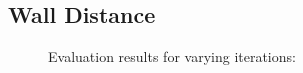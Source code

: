 \subsection{Wall Distance}

\begin{figure}[H]
    \setlength\figureheight{7cm}
    \small
    \setlength\figurewidth{\textwidth}
	\centering
	\begin{tikzpicture}
	    \footnotesize
	    
	    
	\end{tikzpicture}
	
	\caption[Evaluation results for varying  iterations]{Evaluation results for varying  iterations: }
	\label{fig:trial1}
\end{figure}